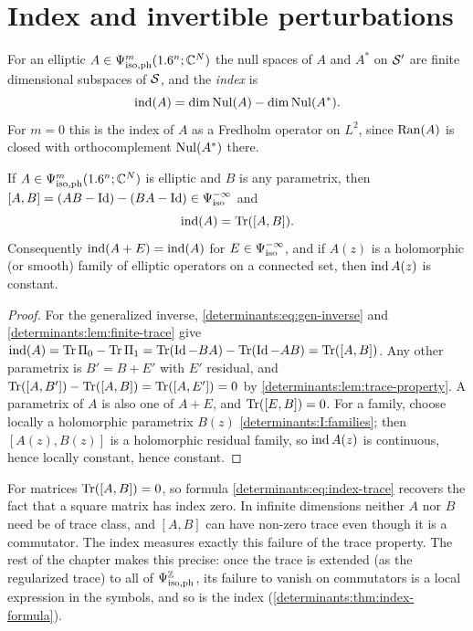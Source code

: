 \section{Index and invertible perturbations}\label{determinants:sec:index}

For an elliptic $A\in\Psi^{m}_{\mathrm{iso,ph}}(1.6^n;\mathbb{C}^N)$ the null spaces of $A$ and $A^*$
on $\mathcal{S}'$ are finite dimensional subspaces of $\mathcal{S}$, and the \emph{index} is
\begin{equation*}
  \operatorname{ind}(A)=\dim\operatorname{Nul}(A)-\dim\operatorname{Nul}(A^*).
\end{equation*}
For $m=0$ this is the index of $A$ as a Fredholm operator on $L^2$, since
$\operatorname{Ran}(A)$ is closed with orthocomplement $\operatorname{Nul}(A^*)$ there.

\begin{proposition}\label{determinants:prop:index-trace}
  If $A\in\Psi^{m}_{\mathrm{iso,ph}}(1.6^n;\mathbb{C}^N)$ is elliptic and $B$ is any parametrix, then
  $[A,B]=(AB-\operatorname{Id})-(BA-\operatorname{Id})\in\Psi^{-\infty}_{\mathrm{iso}}$ and
  \begin{equation}\label{determinants:eq:index-trace}
    \operatorname{ind}(A)=\operatorname{Tr}([A,B]).
  \end{equation}
  Consequently $\operatorname{ind}(A+E)=\operatorname{ind}(A)$ for $E\in\Psi^{-\infty}_{\mathrm{iso}}$, and if $A(z)$
  is a holomorphic (or smooth) family of elliptic operators on a connected set,
  then $\operatorname{ind} A(z)$ is constant.
\end{proposition}
\begin{proof}
  For the generalized inverse, \eqref{determinants:eq:gen-inverse} and
  \cref{determinants:lem:finite-trace} give
  $\operatorname{ind}(A)=\operatorname{Tr}\Pi_0-\operatorname{Tr}\Pi_1=\operatorname{Tr}(\operatorname{Id}-BA)-\operatorname{Tr}(\operatorname{Id}-AB)=\operatorname{Tr}([A,B])$. Any other
  parametrix is $B'=B+E'$ with $E'$ residual, and
  $\operatorname{Tr}([A,B'])-\operatorname{Tr}([A,B])=\operatorname{Tr}([A,E'])=0$ by
  \cref{determinants:lem:trace-property}. A parametrix of $A$ is also one of
  $A+E$, and $\operatorname{Tr}([E,B])=0$. For a family, choose locally a holomorphic
  parametrix $B(z)$ \ref{determinants:I:families}; then $[A(z),B(z)]$ is a
  holomorphic residual family, so $\operatorname{ind} A(z)$ is continuous, hence locally
  constant, hence constant.
\end{proof}

\begin{discussion}
For matrices $\operatorname{Tr}([A,B])=0$, so formula \eqref{determinants:eq:index-trace}
recovers the fact that a square matrix has index zero. In infinite
dimensions neither $A$ nor $B$ need be of trace class, and $[A,B]$ can have
non-zero trace even though it is a commutator. The index measures exactly
this failure of the trace property. The rest of the chapter makes this
precise: once the trace is extended (as the regularized trace) to all of
$\Psi^{\mathbb{Z}}_{\mathrm{iso,ph}}$, its failure to vanish on commutators is a local
expression in the symbols, and so is the index
(\cref{determinants:thm:index-formula}).
\end{discussion}

